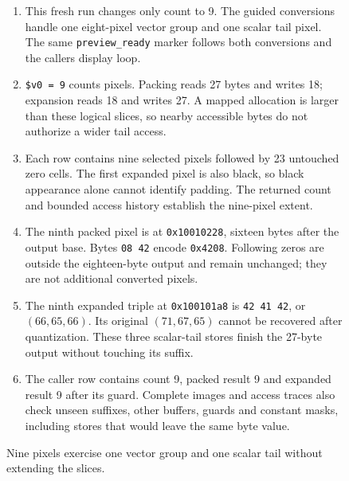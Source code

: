 \begin{figure}[htbp]
  \par\smallskip
  \begin{minipage}{\linewidth}
    \small
    \begin{enumerate}
      \setlength{\itemsep}{2pt}
            \setlength{\parsep}{0pt}
      \item This fresh run changes only count to 9. The guided conversions handle one eight-pixel vector group and one scalar tail pixel. The same \texttt{preview\_ready} marker follows both conversions and the caller\textquotesingle s display loop.
      \item \texttt{\$v0 = 9} counts pixels. Packing reads 27 bytes and writes 18; expansion reads 18 and writes 27. A mapped allocation is larger than these logical slices, so nearby accessible bytes do not authorize a wider tail access.
      \item Each row contains nine selected pixels followed by 23 untouched zero cells. The first expanded pixel is also black, so black appearance alone cannot identify padding. The returned count and bounded access history establish the nine-pixel extent.
      \item The ninth packed pixel is at \texttt{0x10010228}, sixteen bytes after the output base. Bytes \texttt{08 42} encode \texttt{0x4208}. Following zeros are outside the eighteen-byte output and remain unchanged; they are not additional converted pixels.
      \item The ninth expanded triple at \texttt{0x100101a8} is \texttt{42 41 42}, or $(66,65,66)$. Its original $(71,67,65)$ cannot be recovered after quantization. These three scalar-tail stores finish the 27-byte output without touching its suffix.
      \item The caller row contains count 9, packed result 9 and expanded result 9 after its guard. Complete images and access traces also check unseen suffixes, other buffers, guards and constant masks, including stores that would leave the same byte value.
    \end{enumerate}
  \end{minipage}
  \caption{Nine pixels exercise one vector group and one scalar tail without extending the slices.}
  \label{capture:019-rgb-formats-f04}
  \label{rgb-f04}
\end{figure}
\par
